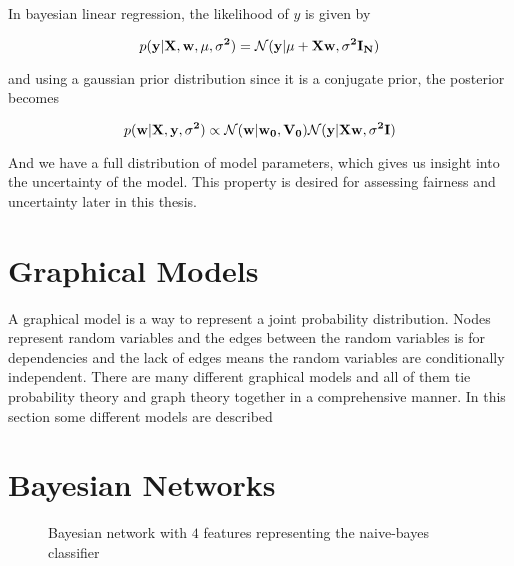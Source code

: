 In bayesian linear regression, the likelihood of $y$ is given by \cite[p.~232]{Murphy:2012:Book}

\begin{equation}
    p(\bf{y}|\bf{X}, \bf{w}, \mu, \sigma^2) = \mathcal{N}(\bf{y}|\mu + \bf{X}\bf{w}, \sigma^2 \bf{I}_N)
\end{equation}

and using a gaussian prior distribution since it is a conjugate prior, the posterior becomes \cite[p.~232]{Murphy:2012:Book}

\begin{equation}
    p(\bf{w}|\bf{X}, \bf{y}, \sigma^2) \propto \mathcal{N}(\bf{w}|\bf{w_0}, \bf{V_0}) \mathcal{N}(\bf{y}|\bf{Xw}, \sigma^2\bf{I})
\end{equation}

And we have a full distribution of model parameters, which gives us insight into the uncertainty of the model. This property is desired for assessing fairness and uncertainty later in this thesis.

\section{Graphical Models}

A graphical model is a way to represent a joint probability distribution. Nodes represent random variables and the edges between the random variables is for dependencies and the lack of edges means the random variables are conditionally independent. \cite[p.~308]{Murphy:2012:Book} There are many different graphical models and all of them tie probability theory and graph theory together in a comprehensive manner. In this section some different models are described

\section{Bayesian Networks}

\begin{figure}[h!]
    \centering
    \caption{Bayesian network with $4$ features representing the naive-bayes classifier}
    \label{fig:my_label}
\end{figure}

